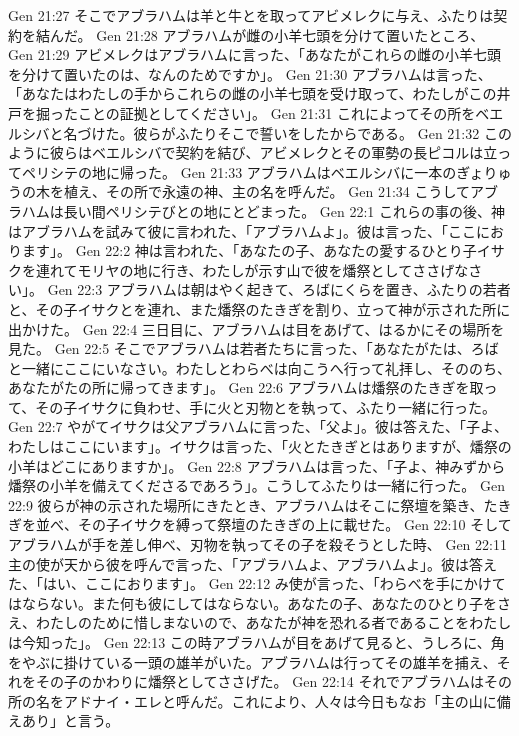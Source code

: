 Gen 21:27  そこでアブラハムは羊と牛とを取ってアビメレクに与え、ふたりは契約を結んだ。
Gen 21:28  アブラハムが雌の小羊七頭を分けて置いたところ、
Gen 21:29  アビメレクはアブラハムに言った、「あなたがこれらの雌の小羊七頭を分けて置いたのは、なんのためですか」。
Gen 21:30  アブラハムは言った、「あなたはわたしの手からこれらの雌の小羊七頭を受け取って、わたしがこの井戸を掘ったことの証拠としてください」。
Gen 21:31  これによってその所をベエルシバと名づけた。彼らがふたりそこで誓いをしたからである。
Gen 21:32  このように彼らはベエルシバで契約を結び、アビメレクとその軍勢の長ピコルは立ってペリシテの地に帰った。
Gen 21:33  アブラハムはベエルシバに一本のぎょりゅうの木を植え、その所で永遠の神、主の名を呼んだ。
Gen 21:34  こうしてアブラハムは長い間ペリシテびとの地にとどまった。
Gen 22:1  これらの事の後、神はアブラハムを試みて彼に言われた、「アブラハムよ」。彼は言った、「ここにおります」。
Gen 22:2  神は言われた、「あなたの子、あなたの愛するひとり子イサクを連れてモリヤの地に行き、わたしが示す山で彼を燔祭としてささげなさい」。
Gen 22:3  アブラハムは朝はやく起きて、ろばにくらを置き、ふたりの若者と、その子イサクとを連れ、また燔祭のたきぎを割り、立って神が示された所に出かけた。
Gen 22:4  三日目に、アブラハムは目をあげて、はるかにその場所を見た。
Gen 22:5  そこでアブラハムは若者たちに言った、「あなたがたは、ろばと一緒にここにいなさい。わたしとわらべは向こうへ行って礼拝し、そののち、あなたがたの所に帰ってきます」。
Gen 22:6  アブラハムは燔祭のたきぎを取って、その子イサクに負わせ、手に火と刃物とを執って、ふたり一緒に行った。
Gen 22:7  やがてイサクは父アブラハムに言った、「父よ」。彼は答えた、「子よ、わたしはここにいます」。イサクは言った、「火とたきぎとはありますが、燔祭の小羊はどこにありますか」。
Gen 22:8  アブラハムは言った、「子よ、神みずから燔祭の小羊を備えてくださるであろう」。こうしてふたりは一緒に行った。
Gen 22:9  彼らが神の示された場所にきたとき、アブラハムはそこに祭壇を築き、たきぎを並べ、その子イサクを縛って祭壇のたきぎの上に載せた。
Gen 22:10  そしてアブラハムが手を差し伸べ、刃物を執ってその子を殺そうとした時、
Gen 22:11  主の使が天から彼を呼んで言った、「アブラハムよ、アブラハムよ」。彼は答えた、「はい、ここにおります」。
Gen 22:12  み使が言った、「わらべを手にかけてはならない。また何も彼にしてはならない。あなたの子、あなたのひとり子をさえ、わたしのために惜しまないので、あなたが神を恐れる者であることをわたしは今知った」。
Gen 22:13  この時アブラハムが目をあげて見ると、うしろに、角をやぶに掛けている一頭の雄羊がいた。アブラハムは行ってその雄羊を捕え、それをその子のかわりに燔祭としてささげた。
Gen 22:14  それでアブラハムはその所の名をアドナイ・エレと呼んだ。これにより、人々は今日もなお「主の山に備えあり」と言う。
